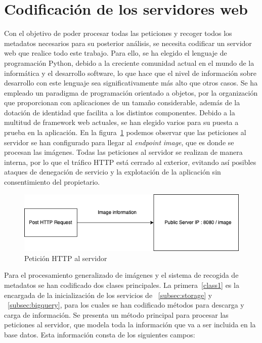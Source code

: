 \section{Codificación de los servidores web}\label{sec:codificación-de-los-servidores-web}
Con el objetivo de poder procesar todas las peticiones y recoger todos los metadatos necesarios para su posterior análisis, se necesita codificar un servidor web que realice todo este trabajo.
Para ello, se ha elegido el lenguaje de programación Python, debido a la creciente comunidad actual en el mundo de la informática y el desarrollo software, lo que hace que el nivel de información sobre desarrollo con este lenguaje sea significativamente más alto que otros casos.
Se ha empleado un paradigma de programación orientado a objetos, por la organización que proporcionan con aplicaciones de un tamaño considerable, además de la dotación de identidad que facilita a los distintos componentes. Debido a la multitud de framework web actuales, se han elegido varios para su puesta a prueba en la aplicación.
En la figura~\ref{fig:Petición HTTP al servidor} podemos observar que las peticiones al servidor se han configurado para llegar al \textit{endpoint} \textit{image}, que es donde se procesan las imágenes.
Todas las peticiones al servidor se realizan de manera interna, por lo que el tráfico HTTP está cerrado al exterior, evitando así posibles ataques de denegación de servicio y la explotación de la aplicación sin consentimiento del propietario.

\begin{figure}
    \centering
    \includegraphics[width=1.0\textwidth]{images/chapter4/http_request.png}
    \caption{Petición HTTP al servidor}
    \label{fig:Petición HTTP al servidor}
\end{figure}

Para el procesamiento generalizado de imágenes y el sistema de recogida de metadatos se han codificado dos clases principales.
La primera~\ref{class1} es la encargada de la inicialización de los servicios de ~\ref{subsec:storage} y ~\ref{subsec:bigquery}, para los cuales se han codificado métodos para descarga y carga de información.
Se presenta un método principal para procesar las peticiones al servidor, que modela toda la información que va a ser incluida en la base datos.
Esta información consta de los siguientes campos:

